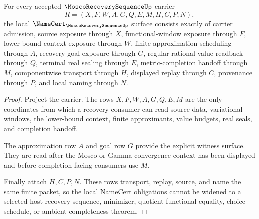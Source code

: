 
\begin{theorem}
\label{thm:mosco-recovery-sequence-namecert-obligations}
For every accepted $\MoscoRecoverySequenceUp$ carrier
$$
R=(X,F,W,A,G,Q,E,M,H,C,P,N),
$$
the local $\NameCert_{\MoscoRecoverySequenceUp}$ surface consists exactly of carrier admission, source exposure through $X$, functional-window exposure through $F$, lower-bound context exposure through $W$, finite approximation scheduling through $A$, recovery-goal exposure through $G$, regular rational value readback through $Q$, terminal real sealing through $E$, metric-completion handoff through $M$, componentwise transport through $H$, displayed replay through $C$, provenance through $P$, and local naming through $N$.
\end{theorem}
\begin{proof}
Project the carrier. The rows $X,F,W,A,G,Q,E,M$ are the only coordinates from which a recovery consumer can read source data, variational windows, the lower-bound context, finite approximants, value budgets, real seals, and completion handoff.

The approximation row $A$ and goal row $G$ provide the explicit witness surface. They are read after the Mosco or Gamma convergence context has been displayed and before completion-facing consumers use $M$.

Finally attach $H,C,P,N$. These rows transport, replay, source, and name the same finite packet, so the local NameCert obligations cannot be widened to a selected host recovery sequence, minimizer, quotient functional equality, choice schedule, or ambient completeness theorem.
\end{proof}

